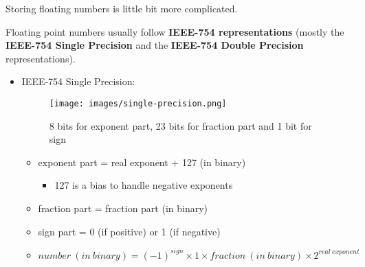 \documentclass[handout]{beamer}[10pt, usepdftitle=false]
\begin{document}
	\begin{frame}
	
	Storing floating numbers is little bit more complicated. 
	
	\vspace*{0.6em}
	Floating point numbers usually follow \textbf{IEEE-754 representations} (mostly the \textbf{IEEE-754 Single Precision} and the \textbf{IEEE-754 Double Precision} representations).
	\vspace*{0.6em}
	
	\begin{itemize}
	\item{IEEE-754 Single Precision:
	\begin{center}
	\begin{figure}
		\texttt{[image: images/single-precision.png]} 
     	\vspace*{-0.5em}
		\caption{8 bits for exponent part, 23 bits for fraction part and 1 bit for sign}
	\end{figure}
	\end{center}	
	
	\begin{itemize}
	\item{exponent part = real exponent + 127 (in binary)
		\begin{itemize}
			\item{127 is a bias to handle negative exponents}
		\end{itemize}	
	}		
	\item{fraction part = fraction part (in binary)}
	\item{sign part = 0 (if positive) or 1 (if negative)}
	\item{\textbf{$number\ (in\ binary) = (-1)^{sign} \times 1 \times fraction\ (in\ binary) \times 2^{real\ exponent}$}} 	
	\end{itemize}		
	
	}	
	
	\end{itemize}	 
			
	\end{frame}		  
\end{document}
